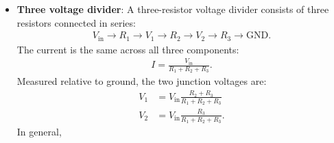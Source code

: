 \documentclass{report}
\begin{document}
\begin{itemize}
            \bigbreak \noindent 
            A real circuit always has some resistance:
            \begin{align*}
                R_{\text{total}} = R_{\text{wire}} + R_{\text{internal}} 
            .\end{align*}
            Thus, 
            \begin{align*}
                I = \frac{V_{\text{battery}}}{R_{\text{wire}} + R_{\text{internal}}}
            .\end{align*}
            Because those resistances are very small, the current can be extremely large.
            \bigbreak \noindent 
            Voltage decreases across resistance according to:
            \begin{align*}
                V_{\text{drop}} = IR
            .\end{align*}
            Even a wire has a small resistance. However, the battery’s internal resistance is often much greater than the short wire’s resistance, so most of the voltage drop occurs inside the battery, with smaller drops across the wire and connection points.
            \bigbreak \noindent 
            As the current moves through these resistances, electrical energy becomes heat:
            \begin{align*}
                P = I^{2}R
            .\end{align*}
            This can make the wire and battery dangerously hot.
        \item \textbf{Three voltage divider}: A three-resistor voltage divider consists of three resistors connected in series:
            \begin{align*}
                V_{\text{in}} \to R_{1} \to V_{1} \to R_{2} \to V_{2} \to R_{3} \to \text{GND}
            .\end{align*}
            The current is the same across all three components:
            \begin{align*}
                I = \frac{V_{\text{in}}}{R_{1} + R_{2} + R_{3}}
            .\end{align*}
            Measured relative to ground, the two junction voltages are:
            \begin{align*}
                V_{1} &= V_{\text{in}}\frac{R_{2} + R_{3}}{R_{1} + R_{2} + R_{3}} \\
                V_{2} &= V_{\text{in}}\frac{R_{3}}{R_{1} + R_{2} + R_{3}} 
            .\end{align*}
            In general,
            \begin{align*}

\end{align*}
\end{itemize}
\end{document}

